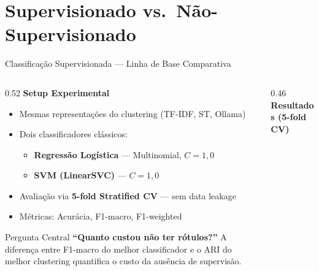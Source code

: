 \documentclass[aspectratio=169]{beamer}
\begin{document}
\section{Supervisionado vs.\ Não-Supervisionado}
\begin{frame}{Classificação Supervisionada — Linha de Base Comparativa}
  \begin{columns}[T]
    \begin{column}{0.52\textwidth}
      \textbf{\color{ufrnblue}Setup Experimental}
      \begin{itemize}\small
        \item Mesmas representações do clustering (TF-IDF, ST, Ollama)
        \item Dois classificadores clássicos:
        \begin{itemize}\footnotesize
          \item \textbf{Regressão Logística} — Multinomial, $C=1{,}0$
          \item \textbf{SVM (LinearSVC)} — $C=1{,}0$
        \end{itemize}
        \item Avaliação via \textbf{5-fold Stratified CV} — sem data leakage
        \item Métricas: Acurácia, F1-macro, F1-weighted
      \end{itemize}
      \vspace{0.4em}
      \begin{block}{\small Pergunta Central}
        \small \textbf{``Quanto custou não ter rótulos?''}\quad
        A diferença entre F1-macro do melhor classificador e o ARI do melhor
        clustering quantifica o custo da ausência de supervisão.
      \end{block}
    \end{column}
    \begin{column}{0.46\textwidth}
      \textbf{\color{ufrnblue}Resultados (5-fold CV)}
      \vspace{0.3em}


\end{column}
\end{columns}
\end{frame}
\end{document}
